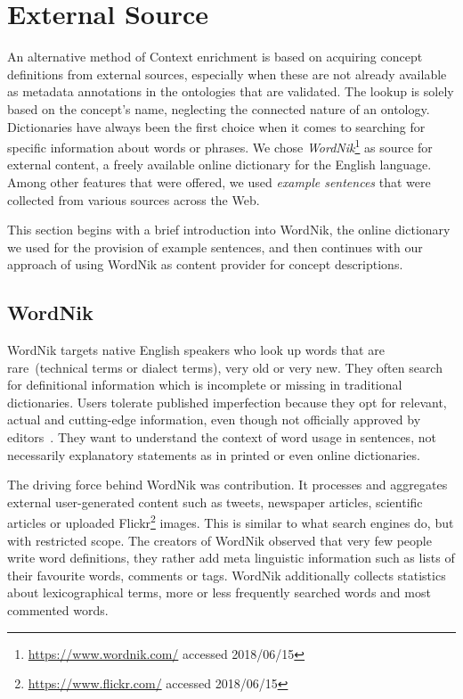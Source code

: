 
\section{External Source}\label{sec:external_source}
An alternative method of Context enrichment is based on acquiring concept definitions from external sources, especially when these are not already available as metadata annotations in the ontologies that are validated. The lookup is solely based on the concept's name, neglecting the connected nature of an ontology. Dictionaries have always been the first choice when it comes to searching for specific information about words or phrases. We chose \textit{WordNik}\footnote{\url{https://www.wordnik.com/} accessed 2018/06/15} as source for external content, a freely available online dictionary for the English language. Among other features that were offered, we used \emph{example sentences} that were collected from various sources across the Web. 

This section begins with a brief introduction into WordNik, the online dictionary we used for the provision of example sentences, and then continues with our approach of using WordNik as content provider for concept descriptions.   


\subsection{WordNik}\label{sec:wordnik}
WordNik targets native English speakers who look up words that are rare~(technical terms or dialect terms), very old or very new. They often search for definitional information which is incomplete or missing in traditional dictionaries. Users tolerate published imperfection because they opt for relevant, actual and cutting-edge information, even though not officially approved by editors~\cite{burnett1979}. They want to understand the context of word usage in sentences, not necessarily explanatory statements as in printed or even online dictionaries.

The driving force behind WordNik was contribution. It processes and aggregates external user-generated content such as tweets, newspaper articles, scientific articles or uploaded Flickr\footnote{\url{https://www.flickr.com/} accessed 2018/06/15} images. This is similar to what search engines do, but with restricted scope. The creators of WordNik observed that very few people write word definitions, they rather add meta linguistic information such as lists of their favourite words, comments or tags. WordNik additionally collects statistics about lexicographical terms, more or less frequently searched words and most commented words. 

